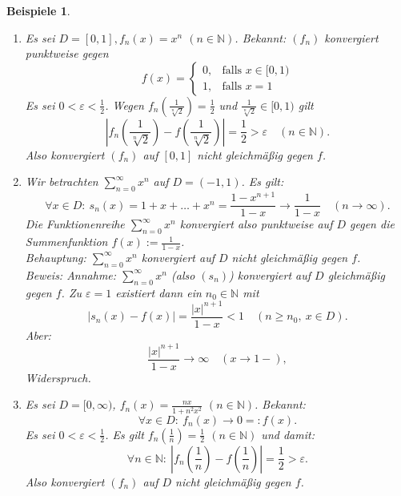 \documentclass[12pt]{extreport} %
\newcommand{\N}{\mathbb{N}}
\theoremstyle{named}
\theoremstyle{itshape}
\theoremstyle{normal}
\newtheorem*{beispiele}{Beispiele}
\begin{document}
{\begin{beispiele} ~\
	\begin{enumerate}
		\item Es sei $D = [0, 1], f_{n}(x) = x^{n}$ $(n \in \N)$. Bekannt: $(f_{n})$ konvergiert punktweise gegen 
			$$ f(x) = \begin{cases} 0, & \text{falls } x \in [0, 1) \\ 1, & \text{falls } x = 1 \end{cases} $$
			Es sei $0 < \varepsilon < \frac{1}{2}$. Wegen $f_{n}(\frac{1}{\sqrt[n]{2}}) = \frac{1}{2}$ und $\frac{1}{\sqrt[n]{2}} \in [0,1)$ gilt
				$$ \left|f_{n}(\frac{1}{\sqrt[n]{2}}) - f(\frac{1}{\sqrt[n]{2}}) \right| = \frac{1}{2} > \varepsilon \quad (n \in \N).$$
			Also konvergiert $(f_{n})$ auf $[0, 1]$ nicht gleichmä{\ss}ig gegen $f$.
		\item Wir betrachten $\sum_{n=0}^{\infty} x^{n}$ auf $D = (-1, 1)$. Es gilt: 
			$$ \forall x \in D: ~ s_{n}(x) = 1 + x + \dotsc + x^{n} = \frac{1 - x^{n+1}}{1 - x} \rightarrow \frac{1}{1 - x} \quad (n \to \infty).  $$
			Die Funktionenreihe $\sum_{n=0}^{\infty} x^{n}$ konvergiert also punktweise auf $D$ gegen die Summenfunktion $f(x):=\frac{1}{1 - x}$. \\ 
			Behauptung: $\sum_{n=0}^{\infty} x^{n}$ konvergiert auf $D$ nicht gleichmä{\ss}ig gegen $f$. \\
			Beweis: Annahme: $\sum_{n=0}^{\infty} x^{n}$ (also $(s_{n})$) konvergiert auf $D$ gleichmä{\ss}ig gegen $f$. Zu $\varepsilon = 1$ existiert dann ein 
			$n_{0} \in \N$ mit
			$$ | s_{n}(x) - f(x) | = \frac{|x|^{n+1}}{1 - x} < 1 \quad (n \geq n_{0}, ~ x \in D). $$
			Aber: $$\frac{|x|^{n+1}}{1 - x} \rightarrow \infty \quad (x \rightarrow 1-),$$ Widerspruch.
		\item Es sei $D = [0, \infty)$, $f_{n}(x) = \frac{nx}{1 + n^{2} x^{2}}$ $(n \in \N)$. Bekannt: 
		        $$
		        \forall x \in D: ~ f_{n}(x) \rightarrow 0 =: f(x).
		        $$
		        Es sei $0 < \varepsilon < \frac{1}{2}$. Es gilt $f_n(\frac{1}{n})=\frac{1}{2}$ $(n \in \N)$ und damit: 
			$$ \forall n \in \N: ~ |f_{n}(\frac{1}{n}) - f(\frac{1}{n})| = \frac{1}{2} > \varepsilon. $$
			Also konvergiert $(f_{n})$ auf $D$ nicht gleichmäßig gegen $f$.
	\end{enumerate}	
\end{beispiele}

}
\end{document}
